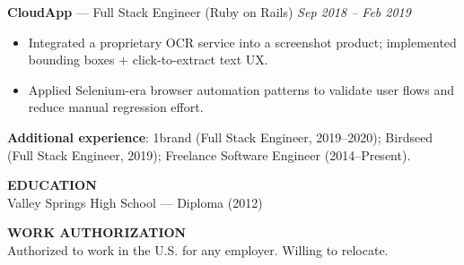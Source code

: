 \documentclass[10pt]{article}
\begin{document}
\textbf{CloudApp} --- Full Stack Engineer (Ruby on Rails) \hfill \textit{Sep 2018 -- Feb 2019}\\
\vspace{-6pt}
\begin{itemize}
  \setlength\itemsep{-2pt}
  \setlength\parskip{0pt}
  \setlength\parsep{0pt}
  \item Integrated a proprietary OCR service into a screenshot product; implemented bounding boxes + click-to-extract text UX.
  \item Applied Selenium-era browser automation patterns to validate user flows and reduce manual regression effort.
\end{itemize}

\textbf{Additional experience}: 1brand (Full Stack Engineer, 2019--2020); Birdseed (Full Stack Engineer, 2019); Freelance Software Engineer (2014--Present).

\vspace{6pt}
\textbf{EDUCATION}\\
Valley Springs High School --- Diploma (2012)

\vspace{2pt}
\textbf{WORK AUTHORIZATION}\\
Authorized to work in the U.S. for any employer. Willing to relocate.
\end{document}
